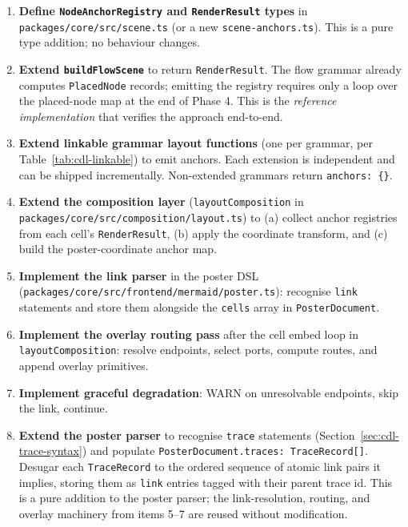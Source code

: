 \begin{enumerate}
  \item \textbf{Define \texttt{NodeAnchorRegistry} and \texttt{RenderResult}
        types} in \texttt{packages/core/src/scene.ts} (or a new
        \texttt{scene-anchors.ts}).  This is a pure type addition; no
        behaviour changes.

  \item \textbf{Extend \texttt{buildFlowScene}} to return
        \texttt{RenderResult}.  The flow grammar already computes
        \texttt{PlacedNode} records; emitting the registry requires only
        a loop over the placed-node map at the end of Phase 4.  This is
        the \emph{reference implementation} that verifies the approach
        end-to-end.

  \item \textbf{Extend linkable grammar layout functions} (one per grammar,
        per Table~\ref{tab:cdl-linkable}) to emit anchors.  Each extension is
        independent and can be shipped incrementally.  Non-extended grammars
        return \texttt{anchors: \{\}}.

  \item \textbf{Extend the composition layer} (\texttt{layoutComposition} in
        \texttt{packages/core/src/composition/layout.ts}) to (a) collect anchor
        registries from each cell's \texttt{RenderResult}, (b) apply the
        coordinate transform, and (c) build the poster-coordinate anchor map.

  \item \textbf{Implement the link parser} in the poster DSL
        (\texttt{packages/core/src/frontend/mermaid/poster.ts}): recognise
        \texttt{link} statements and store them alongside the \texttt{cells}
        array in \texttt{PosterDocument}.

  \item \textbf{Implement the overlay routing pass} after the cell embed loop
        in \texttt{layoutComposition}: resolve endpoints, select ports, compute
        routes, and append overlay primitives.

  \item \textbf{Implement graceful degradation}: WARN on unresolvable
        endpoints, skip the link, continue.

  \item \textbf{Extend the poster parser} to recognise \texttt{trace}
        statements (Section~\ref{sec:cdl-trace-syntax}) and populate
        \texttt{PosterDocument.traces: TraceRecord[]}.  Desugar each
        \texttt{TraceRecord} to the ordered sequence of atomic link pairs it
        implies, storing them as \texttt{link} entries tagged with their
        parent trace id.  This is a pure addition to the poster parser;
        the link-resolution, routing, and overlay machinery from items 5--7
        are reused without modification.


\end{enumerate}
